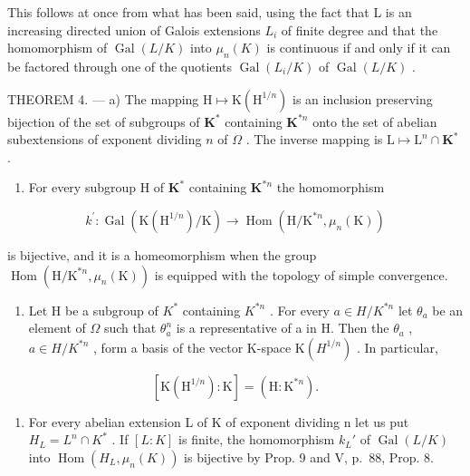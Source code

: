 This follows at once from what has been said, using the fact that L is an increasing directed union of Galois extensions \(L_{i}\) of finite degree and that the homomorphism of \(\operatorname{Gal}(L/K)\) into \(\mu_{n}(K)\) is continuous if and only if it can be factored through one of the quotients \(\operatorname{Gal}(L_{i}/K)\) of \(\operatorname{Gal}(L/K)\) .

THEOREM 4. --- a) The mapping \(\mathrm{H} \mapsto \mathrm{K}\left(\mathrm{H}^{1/n}\right)\) is an inclusion preserving bijection of the set of subgroups of \(\mathbf{K}^*\) containing \(\mathbf{K}^{*n}\) onto the set of abelian subextensions of exponent dividing \(n\) of \(\Omega\) . The inverse mapping is \(\mathrm{L} \mapsto \mathrm{L}^n \cap \mathbf{K}^*\) .

\begin{enumerate}
\def\labelenumi{\alph{enumi})}
\setcounter{enumi}{1}
\tightlist
\item
  For every subgroup H of \(\mathbf{K}^*\) containing \(\mathbf{K}^{*n}\) the homomorphism
\end{enumerate}

\[
k ^ {\prime}: \operatorname{Gal} \left(\mathrm{K} \left(\mathrm{H} ^ {1 / n}\right) / \mathrm{K}\right)\rightarrow \operatorname{Hom} \left(\mathrm{H} / \mathrm{K} ^ {* n}, \mu_ {n} (\mathrm{K})\right)
\]

is bijective, and it is a homeomorphism when the group \(\operatorname{Hom}(\mathrm{H} / \mathrm{K}^{*n},\mu_n(\mathrm{K}))\) is equipped with the topology of simple convergence.

\begin{enumerate}
\def\labelenumi{\alph{enumi})}
\setcounter{enumi}{2}
\tightlist
\item
  Let H be a subgroup of \(K^{*}\) containing \(K^{*n}\) . For every \(a \in H/K^{*n}\) let \(\theta_{a}\) be an element of \(\Omega\) such that \(\theta_{a}^{n}\) is a representative of a in H. Then the \(\theta_{a}\) , \(a \in H/K^{*n}\) , form a basis of the vector K-space \(\mathrm{K}(H^{1/n})\) . In particular,
\end{enumerate}

\[
[ \mathrm{K} (\mathrm{H} ^ {1 / n}): \mathrm{K} ] = (\mathrm{H}: \mathrm{K} ^ {* n}).
\]

\begin{enumerate}
\def\labelenumi{\Alph{enumi})}
\tightlist
\item
  For every abelian extension L of K of exponent dividing n let us put \(H_{L} = L^{n} \cap K^{*}\) . If \([L : K]\) is finite, the homomorphism \(k_{L}'\) of \(\operatorname{Gal}(L/K)\) into \(\operatorname{Hom}(H_{L}, \mu_{n}(K))\) is bijective by Prop. 9 and V, p.~88, Prop. 8.
\end{enumerate}


